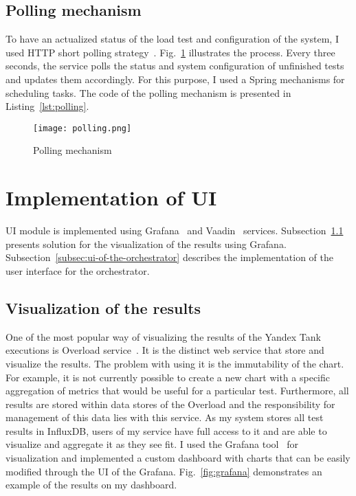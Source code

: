 \subsection{Polling mechanism}\label{subsec:polling_mechanism}
To have an actualized status of the load test and configuration of the system, I used HTTP short polling strategy~\cite{http}.
Fig.~\ref{fig:polling} illustrates the process. Every three seconds, the service polls the status and system configuration of unfinished tests and updates them accordingly.
For this purpose, I used a Spring mechanisms for scheduling tasks. The code of the polling mechanism is presented in Listing~\ref{lst:polling}.
\begin{figure}[t]
    \centering
    \texttt{[image: polling.png]}
    \caption{Polling mechanism}
    \label{fig:polling}
\end{figure}

\begin{flushright}
\begin{minipage}{\textwidth}
    
\end{minipage}
\end{flushright}


\section{Implementation of UI}\label{sec:implementation-of-ui}
UI module is implemented using Grafana~\cite{grafana} and Vaadin~\cite{vaadin} services.
Subsection~\ref{subsec:visualization-of-the-results} presents solution for the visualization of the results using Grafana.
Subsection~\ref{subsec:ui-of-the-orchestrator} describes the implementation of the user interface for the orchestrator.

\subsection{Visualization of the results}\label{subsec:visualization-of-the-results}
One of the most popular way of visualizing the results of the Yandex Tank executions is Overload service~\cite{overload}. It is the distinct web service that store and visualize the results. The problem with using it is the immutability of the chart.
For example, it is not currently possible to create a new chart with a specific aggregation of metrics that would be useful for a particular test. Furthermore, all results are stored within data stores of the Overload and the responsibility for management of this data lies with this service.
As my system stores all test results in InfluxDB, users of my service have full access to it and are able to visualize and aggregate it as they see fit.
I used the Grafana tool~\cite{grafana} for visualization and implemented a custom dashboard with charts that can be easily modified through the UI of the Grafana. Fig.~\ref{fig:grafana} demonstrates an example of the results on my dashboard.


